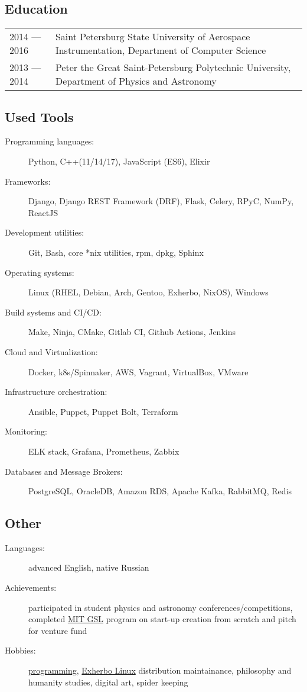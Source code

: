 \documentclass[10pt]{report}
\begin{document}
\subsection*{Education}
\begin{table}[H]
    \begin{tabular}{@{}p{}p{}}
        2014 --- 2016 & Saint Petersburg State University of Aerospace Instrumentation, Department of Computer Science \\
        2013 --- 2014 & Peter the Great Saint-Petersburg Polytechnic University, Department of Physics and Astronomy
    \end{tabular}
\end{table}

\subsection*{Used Tools}
\begin{description}
    \item[Programming languages:]
    Python, C++(11/14/17), JavaScript (ES6), Elixir
    \item[Frameworks:]
    Django, Django REST Framework (DRF), Flask, Celery, RPyC, NumPy, ReactJS
    \item[Development utilities:]
    Git, Bash, core *nix utilities, rpm, dpkg, Sphinx
    \item[Operating systems:]
    Linux (RHEL, Debian, Arch, Gentoo, Exherbo, NixOS), Windows
    \item[Build systems and CI/CD:]
    Make, Ninja, CMake, Gitlab CI, Github Actions, Jenkins
    \item[Cloud and Virtualization:]
    Docker, k8s/Spinnaker, AWS, Vagrant, VirtualBox, VMware
    \item[Infrastructure orchestration:]
    Ansible, Puppet, Puppet Bolt, Terraform
    \item[Monitoring:]
    ELK stack, Grafana, Prometheus, Zabbix
    \item[Databases and Message Brokers:]
    PostgreSQL, OracleDB, Amazon RDS, Apache Kafka, RabbitMQ, Redis
\end{description}

\subsection*{Other}
\begin{description}
    \item[Languages:]
    advanced English, native Russian
    \item[Achievements:]
    participated in student physics and astronomy conferences/competitions,
    completed \href{https://gsl.mit.edu/}{MIT GSL} program on start-up creation from scratch and pitch for venture fund
    \item[Hobbies:]
    \href{https://github.com/unsip}{programming}, \href{https://exherbo.org/}{Exherbo Linux} distribution maintainance,
        philosophy and humanity studies, digital art, spider keeping
\end{description}
\end{document}
